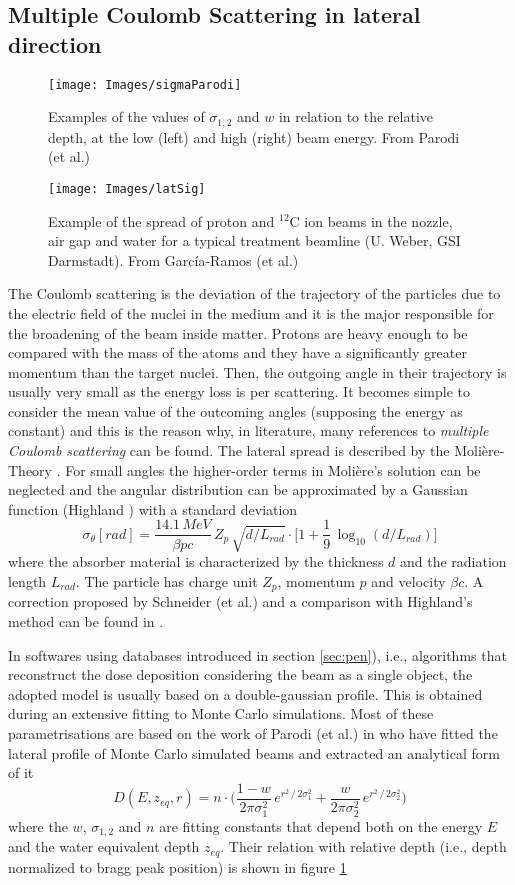 \documentclass[12pt, a4paper, twoside]{book}
\begin{document}
\subsection{Multiple Coulomb Scattering in lateral direction}
\label{sec:mcs}
\begin{figure}[!t]
\centering
\texttt{[image: Images/sigmaParodi]}
\caption{Examples of the values of $\sigma_{1,2}$ and $w$ in relation to the relative depth, at the low (left) and high (right) beam energy. From Parodi (et al.) \cite{par:latspr}}
\label{fig:sigPar}
\end{figure}
\begin{figure}[!t]
\texttt{[image: Images/latSig]}
\caption{Example of the spread of proton and $^{12}$C ion beams in the nozzle, air gap and water for a typical treatment beamline (U. Weber, GSI Darmstadt). From García-Ramos (et al.) \cite{garc:nucu}}
\label{fig:latSig1}
\end{figure}
The Coulomb scattering is the deviation of the trajectory of the particles due to the electric field of the nuclei in the medium and it is the major responsible for the broadening of the beam inside matter. Protons are heavy enough to be compared with the mass of the atoms and they have a significantly greater momentum than the target nuclei. Then, the outgoing angle in their trajectory is usually very small as the energy loss is per scattering. It becomes simple to consider the mean value of the outcoming angles (supposing the energy as constant) and this is the reason why, in literature, many references to \emph{multiple Coulomb scattering} can be found.
The lateral spread is described by the Molière-Theory \cite{mol:mcs}. For small angles the higher-order terms in Molière's solution can be neglected and the angular distribution can be approximated by a Gaussian function (Highland \cite{high:mcs}) with a standard deviation 
\[
\sigma_\theta [rad]= \frac{14.1\,MeV}{\beta pc}\, Z_p\, \sqrt{d/L_{rad}} \cdot \bigg[ 1 + \frac{1}{9}\,\log_{10} (d/L_{rad} )\bigg]
\]
where the absorber material is characterized by the thickness $d$ and the radiation length $L_{rad}$. The particle has charge unit $Z_p$, momentum $p$ and velocity $\beta c$.
A correction proposed by Schneider (et al.) and a comparison with Highland's method can be found in \cite{schn:mcs}. 

In softwares using databases introduced in section \ref{sec:pen}), i.e., algorithms that reconstruct the dose deposition considering the beam as a single object, the adopted model is usually based on a double-gaussian profile. This is obtained during an extensive fitting to Monte Carlo simulations. Most of these parametrisations are based on the work of Parodi (et al.) in \cite{par:latspr} who have fitted the lateral profile of Monte Carlo simulated beams and extracted an analytical form of it
\[
D(E,z_{eq},r) = n\cdot \bigg(  \frac{1-w}{2\pi\sigma_1^2}\,e^{r^2\,/\,2\sigma_1^2} + \frac{w}{2\pi\sigma_2^2}\,e^{r^2\,/\,2\sigma_2^2} \bigg)
\]
where the $w$, $\sigma_{1,2}$ and $n$ are fitting constants that depend both on the energy $E$ and the water equivalent depth $z_{eq}$. Their relation with relative depth (i.e., depth normalized to bragg peak position) is shown in figure \ref{fig:sigPar}
\end{document}
